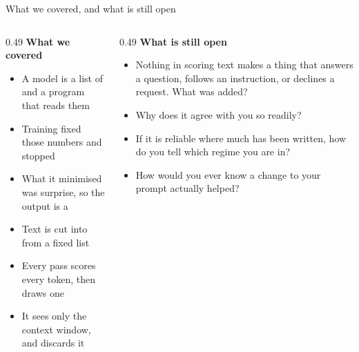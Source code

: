 \documentclass[aspectratio=169,11pt]{beamer}
\begin{document}
\begin{frame}{What we covered, and what is still open}
  \begin{columns}[t]
    \begin{column}{0.49\linewidth}
      {\bfseries What we covered}\\[0.5em]
      {\footnotesize
      \begin{itemize}\itemsep0.25em
        \item A model is a list of  and a program that reads them
        \item Training fixed those numbers and stopped
        \item What it minimised was surprise, so the output is a 
        \item Text is cut into  from a fixed list
        \item Every pass scores every token, then draws one
        \item It sees only the context window, and discards it
      \end{itemize}}
    \end{column}
    \begin{column}{0.49\linewidth}
      {\bfseries What is still open}\\[0.5em]
      {\footnotesize
      \begin{itemize}\itemsep0.25em
        \item Nothing in scoring text makes a thing that answers a question, follows an
              instruction, or declines a request. What was added?
        \item Why does it agree with you so readily?
        \item If it is reliable where much has been written, how do you tell which regime you
              are in?
        \item How would you ever know a change to your prompt actually helped?
      \end{itemize}}
    \end{column}
  \end{columns}
\end{frame}
\end{document}
